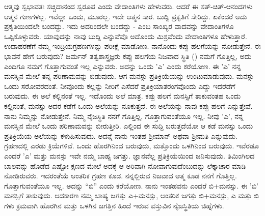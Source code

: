 ಆತ್ಮವು ಸ್ವಭಾವತಃ ಸಚ್ಚಿದಾನಂದ ಸ್ವರೂಪ ಎಂದು ವೇದಾಂತಿಗಳು ಹೇಳುವರು. ಆದರೆ ಈ ಸತ್-ಚಿತ್-ಆನಂದಗಳು ಆತ್ಮನ ಗುಣಗಳಲ್ಲ. ಇವೆಲ್ಲಾ ಒಂದು, ಮೂರಲ್ಲ. ಇದೇ ಆತ್ಮನ ಸಾರ. ಬುದ್ದಿ ಪ್ರಕೃತಿಗೆ ಸೇರಿದ್ದು. ಏಕೆಂದರೆ ಅದು ಪ್ರಕೃತಿಯಿಂದಲೇ ಬಂದದ್ದು. ಇದು ಅದರಿಂದಲೇ ಬಂದದ್ದು - ಎಂಬ ಸಾಂಖ್ಯರ ವಾದವನ್ನು ವೇದಾಂತಿಗಳೂ ಒಪ್ಪಿಕೊಳ್ಳುವರು. ಯಾವುದನ್ನು ನಾವು ಬುದ್ದಿ ಎನ್ನುವೆವೊ ಅದೊಂದು ಮಿಶ್ರವೆಂದು ವೇದಾಂತಿಗಳೂ ಹೇಳುತ್ತಾರೆ. ಉದಾಹರಣೆಗೆ ನಮ್ಮ ಇಂದ್ರಿಯಗ್ರಹಣಗಳನ್ನು ಪರೀಕ್ಷೆ ಮಾಡೋಣ. ನಾನೊಂದು ಕಪ್ಪು ಹಲಗೆಯನ್ನು ನೋಡುತ್ತೇನೆ. ಈ ಭಾವನೆ ಹೇಗೆ ಬರುವುದು? ಜರ್ಮನ್ ತತ್ವಶಾಸ್ತ್ರಜ್ಞರು ಕಪ್ಪು ಹಲಗೆಯ ನಿಜವಾದ ಸ್ಥಿತಿ () ನಮಗೆ ಗೊತ್ತಿಲ್ಲ, ಅದು ಎಂದಿಗೂ ನಮಗೆ ಗೊತ್ತಾಗುವಂತೆ ಇಲ್ಲ ಎನ್ನುವರು. ಅದನ್ನು ಒಂದು 'ಎ' ಎಂದು ಕರೆಯೋಣ. ಈ 'ಎ' ನನ್ನ ಮನಸ್ಸಿನ ಮೇಲೆ ತನ್ನ ಪರಿಣಾಮವನ್ನು ಬಿಡುವುದು. ಆಗ ಮನಸ್ಸು ಪ್ರತಿಕ್ರಿಯೆಯನ್ನು ಉಂಟುಮಾಡುವುದು. ಮನಸ್ಸು ಒಂದು ಸರೋವರದಂತೆ. ನೀವೊಂದು ಕಲ್ಲನ್ನು ನೀರಿಗೆ ಎಸೆದರೆ ಪ್ರತಿಕ್ರಿಯಾತರಂಗವೊಂದು ಎದ್ದು ಇದರೆಡೆಗೆ ಬರುವುದು. ಈ ಅಲೆ ಕಲ್ಲಿನಂತೆ ಇಲ್ಲ. ಇದೊಂದು ಅಲೆ ಮಾತ್ರ. ಕಪ್ಪು ಹಲಗೆ ಮನಸ್ಸಿಗೆ ತಾಕುವಂತಹ ಒಂದು ಕಲ್ಲಿನಂತೆ, ಮನಸ್ಸು ಅದರ ಕಡೆಗೆ ಒಂದು ಅಲೆಯನ್ನು ನೂಕುತ್ತದೆ. ಈ ಅಲೆಯನ್ನು ನಾವು ಕಪ್ಪು ಹಲಗೆ ಎನ್ನುತ್ತೇವೆ. ನಾನು ನಿಮ್ಮನ್ನು ನೋಡುತ್ತೇನೆ. ನಿಮ್ಮ ನೈಜಸ್ಥಿತಿ ನನಗೆ ಗೊತ್ತಿಲ್ಲ, ಗೊತ್ತಾಗುವಂತೆಯೂ ಇಲ್ಲ. ನೀವು 'ಎ', ನನ್ನ ಮನಸ್ಸಿನ ಮೇಲೆ ಒಂದು ಪರಿಣಾಮವನ್ನು ಬೀರುತ್ತೀರಿ. ಎಲ್ಲಿಂದ ಈ ಸುದ್ದಿ ಬರುತ್ತದೆಯೋ ಆ ಕಡೆ ಮನಸ್ಸು ಒಂದು ಪ್ರತಿಕ್ರಿಯೆಯ ಅಲೆಯನ್ನು ಕಳುಹಿಸುವುದು. ಅದನ್ನೆ ನಾನು ಇಂತಹ ಶ‍್ರೀಮಾನ್ ಅಥವಾ ಶ‍್ರೀಮತಿ ಎನ್ನುವುದು. ಗ್ರಹಣದಲ್ಲಿ ಎರಡು ಕ್ರಿಯೆಗಳಿವೆ. ಒಂದು ಹೊರಗಿನಿಂದ ಬರುವುದು, ಮತ್ತೊಂದು ಒಳಗಿನಿಂದ ಬರುವುದು. ಇವೆರಡೂ ಎಂದರೆ 'ಎ' ಮತ್ತು ಮನಸ್ಸು ಇವೇ ನಮ್ಮ ಬಾಹ್ಯ ಜಗತ್ತು. ಜ್ಞಾನವೆಲ್ಲ ಪ್ರತಿಕ್ರಿಯೆಯಿಂದ ಜನಿಸುವುದು. ತಿಮಿಂಗಿಲದ ಬಾಲವನ್ನು ಹೊಡೆದ ಎಷ್ಟೋ ಕ್ಷಣದ ಮೇಲೆ ಅದಕ್ಕೆ ಆ ಅರಿವಾಗಿ ನೋವಾಗುವುದೆಂಬುದನ್ನು ಲೆಕ್ಕಾಚಾರ ಮಾಡಿ ನೋಡಿರುವರು. ಇದರಂತೆಯೆ ಆಂತರಿಕ ಗ್ರಹಣ ಕೂಡ. ನನ್ನಲ್ಲಿರುವ ನಿಜವಾದ ಆತ್ಮ ಕೂಡ ನನಗೆ ಗೊತ್ತಿಲ್ಲ. ಗೊತ್ತಾಗುವಂತೆಯೂ ಇಲ್ಲ. ಅದನ್ನು “ಬಿ” ಎಂದು ಕರೆಯೋಣ. ನಾನು ಇಂತಹವನು ಎಂದರೆ ಬಿ+ಮನಸ್ಸು. ಈ 'ಬಿ' ಮನಸ್ಸಿಗೆ ತಾಕುವುದು. ಆದಕಾರಣ ನಮ್ಮ ಬಾಹ್ಯ ಜಗತ್ತು ಎ+ಮನಸ್ಸು, ಆಂತರಿಕ ಜಗತ್ತು ಬಿ+ಮನಸ್ಸು, ಎ ಮತ್ತು ಬಿ ಗಳು ಕ್ರಮವಾಗಿ ಹೊರಗಿನ ಮತ್ತು ಒಳಗಿನ ಜಗತ್ತಿನ ಹಿಂದೆ ಇರುವ ವಸ್ತುವಿನ ನೈಜಸ್ಥಿತಿಯ ಚಿಹ್ನೆಗಳು.


